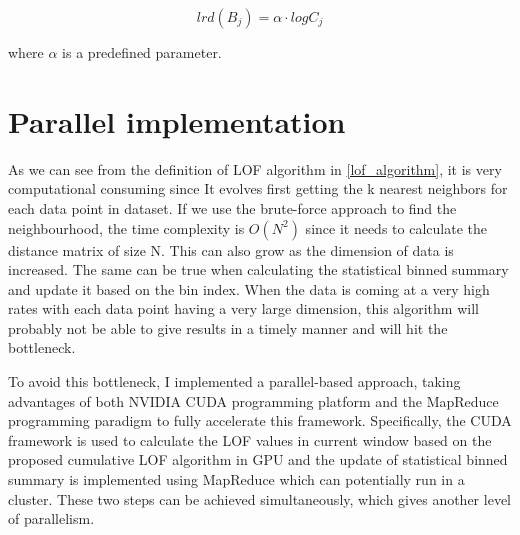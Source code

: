 \documentclass[11pt]{article}       %
\begin{document}
\begin{equation} \label{vir_lrd}
	lrd(B_j) = \alpha \cdot log C_j 
\end{equation}

where $\alpha$ is a predefined parameter.

\section{Parallel implementation} \label{proapp}

As we can see from the definition of LOF algorithm in \ref{lof_algorithm}, it is very computational consuming since It evolves first getting the k nearest neighbors for each data point in dataset. If we use the brute-force approach to find the neighbourhood, the time complexity is $O(N^2)$ since it needs to calculate the distance matrix of size N. This can also grow as the dimension of data is increased. The same can be true when calculating the statistical binned summary and update it based on the bin index. When the data is coming at a very high rates with each data point having a very large dimension, this algorithm will probably not be able to give results in a timely manner and will hit the bottleneck. 

To avoid this bottleneck, I implemented a parallel-based approach, taking advantages of both NVIDIA CUDA programming platform and the MapReduce programming paradigm to fully accelerate this framework. Specifically, the CUDA framework is used to calculate the LOF values in current window based on the proposed cumulative LOF algorithm in GPU and the update of statistical binned summary is implemented using MapReduce which can potentially run in a cluster. These two steps can be achieved simultaneously, which gives another level of parallelism.
\end{document}
